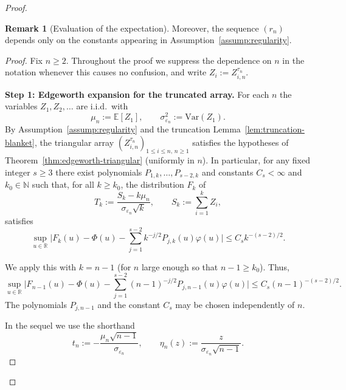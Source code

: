 \documentclass{article}
\theoremstyle{plain}
\theoremstyle{definition}
\newtheorem{lemma}[theorem]{Remark}
\begin{document}
\begin{proof}
\begin{lemma}[Evaluation of the expectation]
Moreover, the sequence $(r_n)$ depends only on the constants appearing
in Assumption~\ref{assump:regularity}.
\end{lemma}

\begin{proof}
Fix $n\ge2$. Throughout the proof we suppress the dependence on $n$ in
the notation whenever this causes no confusion, and write
$Z_i := Z_{i,n}^{\tau_n}$.

\medskip\noindent\textbf{Step 1: Edgeworth expansion for the truncated
array.}
For each $n$ the variables $Z_1,Z_2,\dots$ are i.i.d.\ with
\[
  \mu_n := \mathbb E[Z_1],\qquad
  \sigma_{\varepsilon_n}^2 := \mathrm{Var}(Z_1).
\]
By Assumption~\ref{assump:regularity} and the truncation
Lemma~\ref{lem:truncation-blanket}, the triangular array
$(Z_{i,n}^{\tau_n})_{1\le i\le n,\,n\ge1}$ satisfies the hypotheses of
Theorem~\ref{thm:edgeworth-triangular} (uniformly in $n$).
In particular, for any fixed integer $s\ge3$ there exist
polynomials $P_{1,k},\dots,P_{s-2,k}$ and constants
$C_s<\infty$ and $k_0\in\mathbb N$ such that, for all
$k\ge k_0$, the distribution $F_k$ of
\[
  T_k
  := \frac{S_k-k\mu_n}{\sigma_{\varepsilon_n}\sqrt{k}},
  \qquad
  S_k:=\sum_{i=1}^k Z_i,
\]
satisfies
\[
  \sup_{u\in\mathbb R}
  \biggl|
    F_k(u) - \Phi(u)
    - \sum_{j=1}^{s-2}k^{-j/2}P_{j,k}(u)\varphi(u)
  \biggr|
  \le C_s k^{-(s-2)/2}.
\]

We apply this with $k=n-1$ (for $n$ large enough so that $n-1\ge k_0$).
Thus,
\begin{equation}
  \label{eq:edgeworth-remainder-n}
  \sup_{u\in\mathbb R}
  \biggl|
    F_{n-1}(u) - \Phi(u)
    - \sum_{j=1}^{s-2}(n-1)^{-j/2}P_{j,n-1}(u)\varphi(u)
  \biggr|
  \le C_s (n-1)^{-(s-2)/2}.
\end{equation}
The polynomials $P_{j,n-1}$ and the constant $C_s$ may be chosen
independently of $n$.

In the sequel we use the shorthand
\[
  t_n := -\frac{\mu_n\sqrt{n-1}}{\sigma_{\varepsilon_n}},
  \qquad
  \eta_n(z) := \frac{z}{\sigma_{\varepsilon_n}\sqrt{n-1}}.
\]


\end{proof}
\end{proof}
\end{document}
